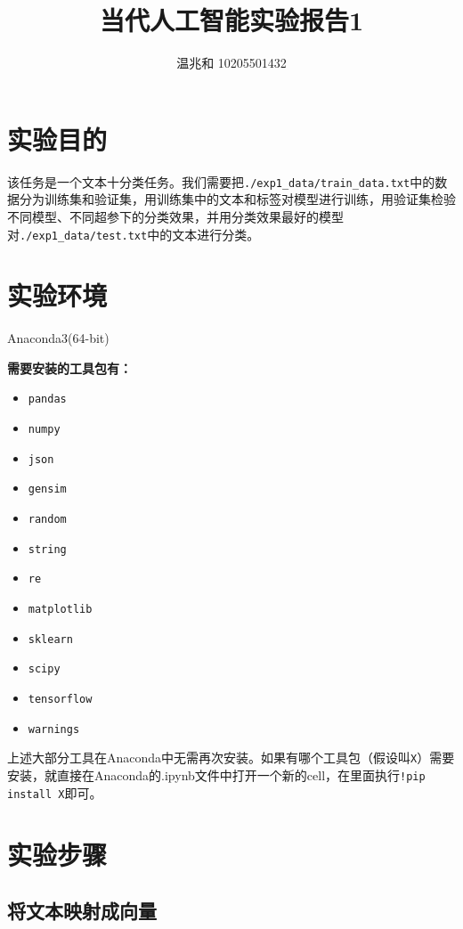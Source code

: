 \documentclass{article}
\title{当代人工智能实验报告1}
\author{温兆和 10205501432}
\begin{document}
\maketitle

\section{实验目的}

该任务是一个文本十分类任务。我们需要把\lstinline|./exp1_data/train_data.txt|中的数据分为训练集和验证集，用训练集中的文本和标签对模型进行训练，用验证集检验不同模型、不同超参下的分类效果，并用分类效果最好的模型对\lstinline|./exp1_data/test.txt|中的文本进行分类。

\section{实验环境}
Anaconda3(64-bit)

\textbf{需要安装的工具包有：}
\begin{spacing}{0.5}
\begin{itemize}
\item \lstinline|pandas|
\item \lstinline|numpy|
\item \lstinline|json|
\item \lstinline|gensim|
\item \lstinline|random|
\item \lstinline|string|
\item \lstinline|re|
\item \lstinline|matplotlib|
\item \lstinline|sklearn|
\item \lstinline|scipy|
\item \lstinline|tensorflow|
\item \lstinline|warnings|
\end{itemize}
\end{spacing}

上述大部分工具在Anaconda中无需再次安装。如果有哪个工具包（假设叫\lstinline|X|）需要安装，就直接在Anaconda的.ipynb文件中打开一个新的cell，在里面执行\lstinline|!pip install X|即可。
\section{实验步骤}
\subsection{将文本映射成向量}
\end{document}
